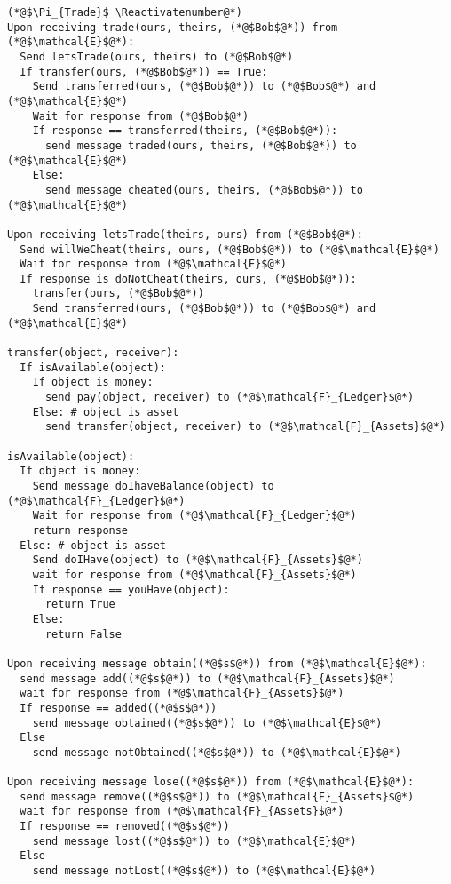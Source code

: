 \Suppressnumber
\begin{lstlisting}[label=tradeprot, style=numbers]
(*@$\Pi_{Trade}$ \Reactivatenumber@*)
Upon receiving trade(ours, theirs, (*@$Bob$@*)) from (*@$\mathcal{E}$@*):
  Send letsTrade(ours, theirs) to (*@$Bob$@*)
  If transfer(ours, (*@$Bob$@*)) == True:
    Send transferred(ours, (*@$Bob$@*)) to (*@$Bob$@*) and (*@$\mathcal{E}$@*)
    Wait for response from (*@$Bob$@*)
    If response == transferred(theirs, (*@$Bob$@*)):
      send message traded(ours, theirs, (*@$Bob$@*)) to (*@$\mathcal{E}$@*)
    Else:
      send message cheated(ours, theirs, (*@$Bob$@*)) to (*@$\mathcal{E}$@*)

Upon receiving letsTrade(theirs, ours) from (*@$Bob$@*):
  Send willWeCheat(theirs, ours, (*@$Bob$@*)) to (*@$\mathcal{E}$@*)
  Wait for response from (*@$\mathcal{E}$@*)
  If response is doNotCheat(theirs, ours, (*@$Bob$@*)):
    transfer(ours, (*@$Bob$@*))
    Send transferred(ours, (*@$Bob$@*)) to (*@$Bob$@*) and (*@$\mathcal{E}$@*)

transfer(object, receiver):
  If isAvailable(object):
    If object is money:
      send pay(object, receiver) to (*@$\mathcal{F}_{Ledger}$@*)
    Else: # object is asset
      send transfer(object, receiver) to (*@$\mathcal{F}_{Assets}$@*)

isAvailable(object):
  If object is money:
    Send message doIhaveBalance(object) to (*@$\mathcal{F}_{Ledger}$@*)
    Wait for response from (*@$\mathcal{F}_{Ledger}$@*)
    return response
  Else: # object is asset
    Send doIHave(object) to (*@$\mathcal{F}_{Assets}$@*)
    wait for response from (*@$\mathcal{F}_{Assets}$@*)
    If response == youHave(object):
      return True
    Else:
      return False

Upon receiving message obtain((*@$s$@*)) from (*@$\mathcal{E}$@*):
  send message add((*@$s$@*)) to (*@$\mathcal{F}_{Assets}$@*)
  wait for response from (*@$\mathcal{F}_{Assets}$@*)
  If response == added((*@$s$@*))
    send message obtained((*@$s$@*)) to (*@$\mathcal{E}$@*)
  Else
    send message notObtained((*@$s$@*)) to (*@$\mathcal{E}$@*)

Upon receiving message lose((*@$s$@*)) from (*@$\mathcal{E}$@*):
  send message remove((*@$s$@*)) to (*@$\mathcal{F}_{Assets}$@*)
  wait for response from (*@$\mathcal{F}_{Assets}$@*)
  If response == removed((*@$s$@*))
    send message lost((*@$s$@*)) to (*@$\mathcal{E}$@*)
  Else
    send message notLost((*@$s$@*)) to (*@$\mathcal{E}$@*)
\end{lstlisting}
